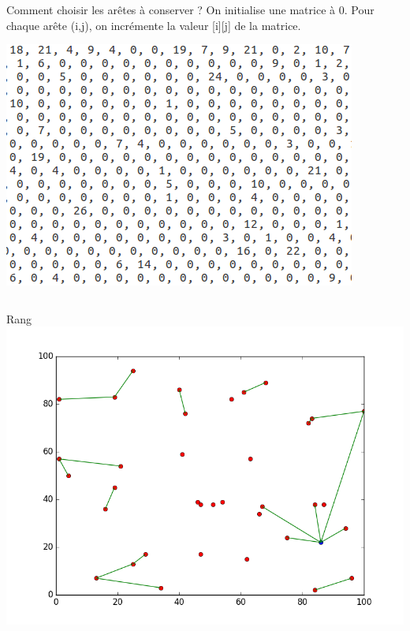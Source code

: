\documentclass{beamer}
\begin{document}
\begin{frame}{Comment choisir les arêtes à conserver ?}
On initialise une matrice à 0.
Pour chaque arête (i,j), on incrémente la valeur [i][j] de la matrice.

\centering
\includegraphics[scale=0.25]{sousmatrice.png}

\begin{columns}[t]

  \begin{column}{4cm}
  	\centering
  	Rang
	\includegraphics[scale=0.2]{edges_rang.png}
 

  \end{column}
  

\end{columns}
\end{frame}
\end{document}
